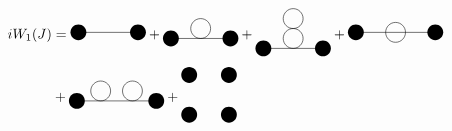 \begin{equation}
    \begin{aligned}
    iW_1(J)&=
    \begin{gathered}
        \begin{tikzpicture}
        \fill [black] (0,0) circle (0.2 cm);
        \draw (0,0) -- (1.5,0);
        \fill[black] (1.5,0) circle (0.2cm);
        \end{tikzpicture}
    \end{gathered}+
    \begin{gathered}
        \begin{tikzpicture}
        \fill [black] (0,0) circle (0.2 cm);
        \draw (0,0) -- (1.5,0);
        \fill[black] (1.5,0) circle (0.2cm);
        \draw (0.75,0.25) circle (0.25 cm);
        \end{tikzpicture}
    \end{gathered}+
    \begin{gathered}
        \begin{tikzpicture}
        \fill [black] (0,0) circle (0.2 cm);
        \draw (0,0) -- (1.5,0);
        \fill[black] (1.5,0) circle (0.2cm);
        \draw (0.75,0.25) circle (0.25 cm);
        \draw (0.75,0.75) circle (0.25 cm);
        \end{tikzpicture}
    \end{gathered}+
    \begin{gathered}
        \begin{tikzpicture}
        \fill [black] (0,0) circle (0.2 cm);
        \draw (0,0) -- (2,0);
        \fill[black] (2,0) circle (0.2cm);
        \draw (1,0) circle (0.25 cm);
        \end{tikzpicture}
    \end{gathered}\\
    &+\begin{gathered}
        \begin{tikzpicture}
        \fill [black] (0,0) circle (0.2 cm);
        \draw (0,0) -- (2,0);
        \fill[black] (2,0) circle (0.2cm);
        \draw (0.6,0.25) circle (0.25 cm);
        \draw (1.4,0.25) circle (0.25 cm);
        \end{tikzpicture}
    \end{gathered}+
    \begin{gathered}
        \begin{tikzpicture}
        \fill [black] (-0.5,-0.5) circle (0.2 cm);
        \fill [black] (-0.5,0.5) circle (0.2 cm);
        \fill [black] (0.5,0.5) circle (0.2 cm);
        \fill [black] (0.5,-0.5) circle (0.2 cm);

\end{tikzpicture}
\end{gathered}
\end{aligned}
\end{equation}
